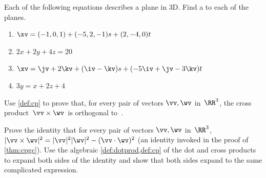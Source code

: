 \begin{exercise}  
Each of the following equations describes a plane in 3D.
Find a  to each of the planes.
\begin{enumerate}
\item \(\xv=(-1,0,1)+(-5,2,-1)s+(2,-4,0)t\)

\item \(2x+2y+4z=20\)


\item \(\xv=\jv+2\kv+(\iv-\kv)s+(-5\iv+\jv-3\kv)t\)
\answer{\(\propto\iv+8\jv+\kv\)}

\item \(3y=x+2z+4\)
\answer{\(\propto -\iv+3\jv-2\kv\)}


\end{enumerate}
\end{exercise}







\begin{exercise} \label{ex:cpga} 
Use \cref{def:cp} to prove that, for every pair of vectors \(\vv,\wv\) in~\(\RR^3\), the cross product~\(\vv\times\wv\)~is orthogonal to~\wv.
\end{exercise}




\begin{exercise} \label{ex:cpgc} 
Prove the identity that for every pair of vectors \(\vv,\wv\) in~\(\RR^3\), \(|\vv\times\wv|^2=|\vv|^2|\wv|^2-(\vv\cdot\wv)^2\) (an identity invoked in the proof of \cref{thm:cpgc}). 
Use the algebraic \cref{def:dotprod,def:cp} of the dot and cross products to expand both sides of the identity and show that both sides expand to the same complicated expression.
\end{exercise}




